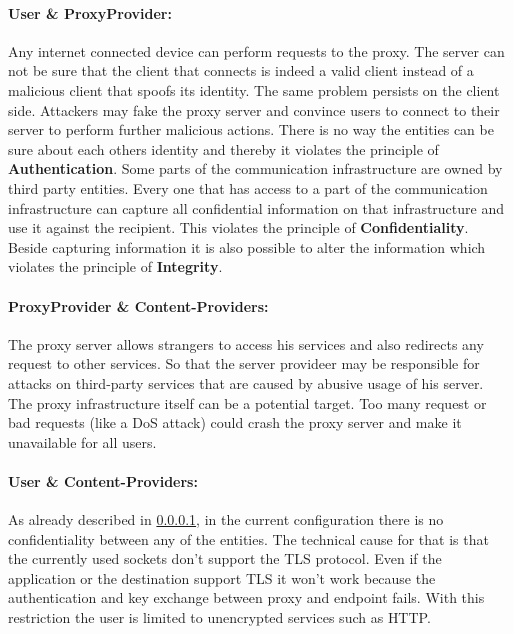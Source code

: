 \documentclass[12pt, a4paper]{scrartcl}
\begin{document}
\paragraph{User \& ProxyProvider:}\label{ssec::user}
\noindent Any internet connected device can perform requests to the proxy. The server can not be sure that the client that connects is indeed a valid client instead of a malicious client that spoofs its identity. The same problem persists on the client side. Attackers may fake the proxy server and convince users to connect to their server to perform further malicious actions. There is no way the entities can be sure about each others identity and thereby it violates the principle of \textbf{Authentication}.\newline
Some parts of the communication infrastructure are owned by third party entities. Every one that has access to a part of the communication infrastructure can capture all confidential information on that infrastructure and use it against the recipient. This violates the principle of \textbf{Confidentiality}.\newline
Beside capturing information it is also possible to alter the information which violates the principle of \textbf{Integrity}.
\paragraph{ProxyProvider \& Content-Providers:}
The proxy server allows strangers to access his services and also redirects any request to other services. So that the server provideer may be responsible for attacks on third-party services that are caused by abusive usage of his server.\newline
The proxy infrastructure itself can be a potential target. Too many request or bad requests (like a \ac{DoS} attack) could crash the proxy server and make it unavailable for all users.
\paragraph{User \& Content-Providers:}
As already described in \@\ref{ssec::user}, in the current configuration there is no confidentiality between any of the entities. The technical cause for that is that the currently used sockets don't support the \ac{TLS} protocol. Even if the application or the destination support \ac{TLS} it won't work because the authentication and key exchange between proxy and endpoint fails. With this restriction the user is limited to unencrypted services such as \acs{HTTP}.
\end{document}

